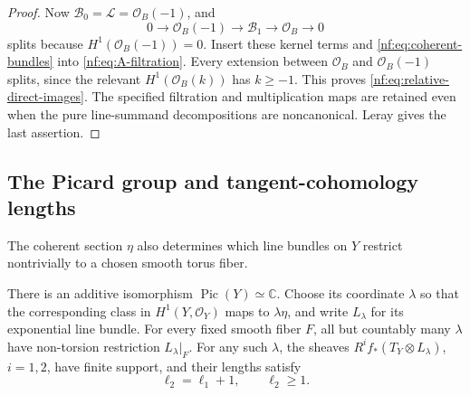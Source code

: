 \begin{proof}
Now $\mathcal B_0=\mathcal L=\mathcal O_B(-1)$, and
\[
 0\longrightarrow\mathcal O_B(-1)
 \longrightarrow\mathcal B_1\longrightarrow\mathcal O_B
 \longrightarrow0
\]
splits because $H^1(\mathcal O_B(-1))=0$.
Insert these kernel terms and \eqref{nf:eq:coherent-bundles}
into \eqref{nf:eq:A-filtration}. Every extension between
$\mathcal O_B$ and $\mathcal O_B(-1)$ splits, since the
relevant $H^1(\mathcal O_B(k))$ has $k\ge-1$.
This proves \eqref{nf:eq:relative-direct-images}.
The specified filtration and multiplication maps are retained
even when the pure line-summand decompositions are noncanonical.
Leray gives the last assertion.
\end{proof}

\subsection{The Picard group and tangent-cohomology lengths}

The coherent section $\eta$ also determines which line bundles
on $Y$ restrict nontrivially to a chosen smooth torus fiber.

\begin{corollary}\label{nf:cor:picard}
There is an additive isomorphism
$\operatorname{Pic}(Y)\simeq\mathbb C$.
Choose its coordinate $\lambda$ so that the corresponding
class in $H^1(Y,\mathcal O_Y)$ maps to $\lambda\eta$, and
write $L_\lambda$ for its exponential line bundle.
For every fixed smooth fiber $F$, all but countably many
$\lambda$ have non-torsion restriction $L_\lambda|_F$.
For any such $\lambda$, the sheaves
$R^if_*(T_Y\otimes L_\lambda)$, $i=1,2$, have finite support,
and their lengths satisfy
\[
 \ell_2=\ell_1+1,\qquad \ell_2\ge1.
\]
\end{corollary}

